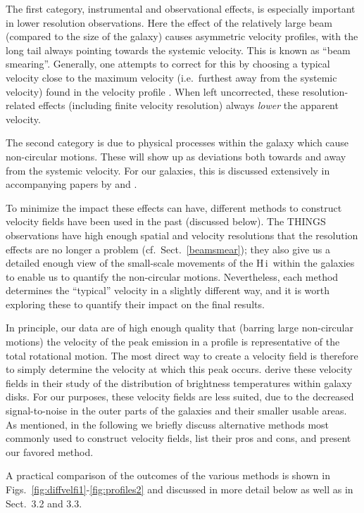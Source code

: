 \documentclass[usenatbib,usegraphicx,apjfonts,floatfix]{emulateapj}
\newcommand{\HI}{H\,{\sc i}}
\begin{document}
The first category, instrumental and observational effects, is
especially important in lower resolution observations. Here the effect
of the relatively large beam (compared to the size of the galaxy)
causes asymmetric velocity profiles, with the long tail always
pointing towards the systemic velocity. This is known as ``beam
smearing''.  Generally, one attempts to correct for this by choosing a
typical velocity close to the maximum velocity (i.e.\ furthest away
from the systemic velocity) found in the velocity profile
\citep[e.g.][]{sancisi_allen}.  When left uncorrected, these
resolution-related effects (including finite velocity resolution)
always \emph{lower} the apparent velocity.

The second category is due to physical processes within the galaxy
which cause non-circular motions. These will show up as deviations
both towards and away from the systemic velocity. For our galaxies,
this is discussed extensively in accompanying papers by \citet{oh2007} and
\citet{clemens2007}.

To minimize the impact these effects can have, different methods to
construct velocity fields have been used in the past (discussed below).  The THINGS observations have high enough
spatial and velocity resolutions that the resolution effects are no
longer a problem (cf.\ Sect.~\ref{beamsmear}); they also give us a
detailed enough view of the small-scale movements of the \HI\ within
the galaxies to enable us to quantify the non-circular motions.
Nevertheless, each method determines the ``typical'' 
velocity in a slightly different way, and it is worth exploring these
to quantify their impact on the final results.

In principle, our data are of high enough quality that (barring large
non-circular motions) the velocity of the peak emission in a profile
is representative of the total rotational motion. The most direct way
to create a velocity field is therefore to simply determine the
velocity at which this peak occurs.  \citet{usero2007} derive these
velocity fields in their study of the distribution of brightness
temperatures within galaxy disks.  For our purposes, these velocity
fields are less suited, due to the decreased signal-to-noise in the
outer parts of the galaxies and their smaller usable areas.  As
mentioned, in the following we briefly discuss alternative methods
most commonly used to construct velocity fields, list their pros and
cons, and present our favored method.

A practical comparison of the outcomes of the various methods is shown
in Figs.~\ref{fig:diffvelfi1}-\ref{fig:profiles2} and discussed in
more detail below as well as in Sect.\ 3.2 and 3.3.
\end{document}
